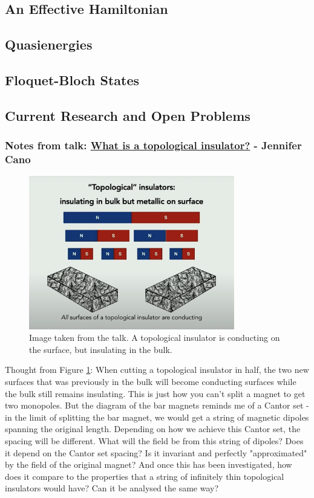 \documentclass[a4paper]{article}
\begin{document}
    \subsection{An Effective Hamiltonian}
    \subsection{Quasienergies}
    \subsection{Floquet-Bloch States}
    \subsection{Current Research and Open Problems}
    \subsubsection{Notes from talk: \href{https://www.youtube.com/watch?v=YwaF5IC8eBY&ab_channel=KavliInstituteforTheoreticalPhysics}{What is a topological insulator?} - Jennifer Cano}
    \begin{figure}[h]
        \centering
        \includegraphics[width=0.8\textwidth]{top-cantor-magnet.png}
        \caption{Image taken from the talk. A topological insulator is conducting on the surface, but insulating in the bulk.}
        \label{fig:top-cantor-magnet}
    \end{figure}
    Thought from Figure \ref{fig:top-cantor-magnet}: When cutting a topological insulator in half, the two new surfaces that was previously in the bulk will become conducting surfaces while the bulk still remains insulating. This is just how you can't split a magnet to get two monopoles. But the diagram of the bar magnets reminds me of a Cantor set - in the limit of splitting the bar magnet, we would get a string of magnetic dipoles spanning the original length. Depending on how we achieve this Cantor set, the spacing will be different. What will the field be from this string of dipoles? Does it depend on the Cantor set spacing? Is it invariant and perfectly "approximated" by the field of the original magnet? And once this has been investigated, how does it compare to the properties that a string of infinitely thin topological insulators would have? Can it be analysed the same way?
\end{document}
